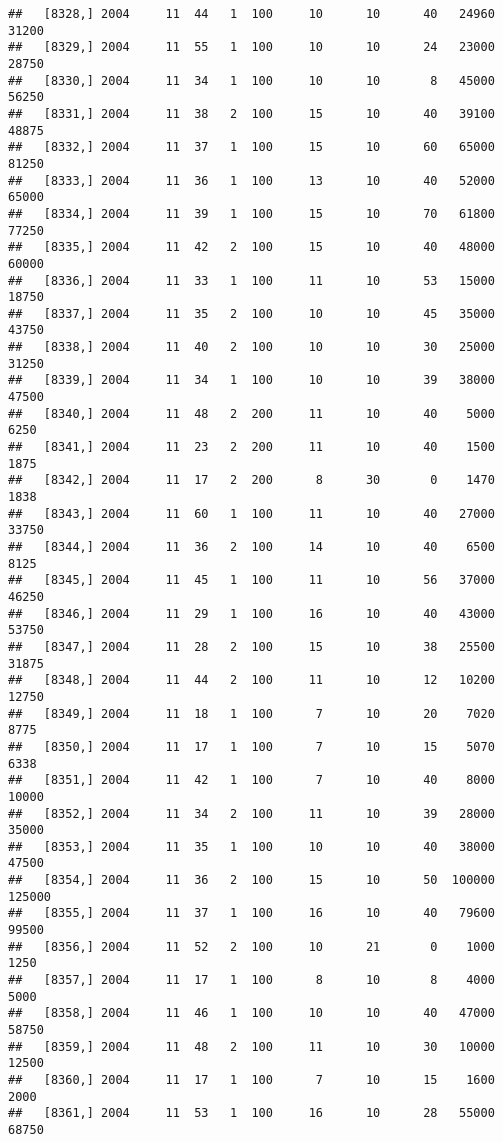 \documentclass{article}\usepackage[]{graphicx}\usepackage[]{color}
\makeatletter
\newenvironment{kframe}{%
 \def\at@end@of@kframe{}%
 \ifinner\ifhmode%
  \def\at@end@of@kframe{\end{minipage}}%
  \begin{minipage}{\columnwidth}%
 \fi\fi%
 \def\FrameCommand##1{\hskip\@totalleftmargin \hskip-\fboxsep
 \colorbox{shadecolor}{##1}\hskip-\fboxsep
     \hskip-\linewidth \hskip-\@totalleftmargin \hskip\columnwidth}%
 \MakeFramed {\advance\hsize-\width
   \@totalleftmargin\z@ \linewidth\hsize
   \@setminipage}}%
 {\par\unskip\endMakeFramed%
 \at@end@of@kframe}
\newenvironment{knitrout}{}{} %
\makeatother
\begin{document}
\begin{knitrout}
\begin{kframe}
\begin{verbatim}
##   [8328,] 2004     11  44   1  100     10      10      40   24960   31200
##   [8329,] 2004     11  55   1  100     10      10      24   23000   28750
##   [8330,] 2004     11  34   1  100     10      10       8   45000   56250
##   [8331,] 2004     11  38   2  100     15      10      40   39100   48875
##   [8332,] 2004     11  37   1  100     15      10      60   65000   81250
##   [8333,] 2004     11  36   1  100     13      10      40   52000   65000
##   [8334,] 2004     11  39   1  100     15      10      70   61800   77250
##   [8335,] 2004     11  42   2  100     15      10      40   48000   60000
##   [8336,] 2004     11  33   1  100     11      10      53   15000   18750
##   [8337,] 2004     11  35   2  100     10      10      45   35000   43750
##   [8338,] 2004     11  40   2  100     10      10      30   25000   31250
##   [8339,] 2004     11  34   1  100     10      10      39   38000   47500
##   [8340,] 2004     11  48   2  200     11      10      40    5000    6250
##   [8341,] 2004     11  23   2  200     11      10      40    1500    1875
##   [8342,] 2004     11  17   2  200      8      30       0    1470    1838
##   [8343,] 2004     11  60   1  100     11      10      40   27000   33750
##   [8344,] 2004     11  36   2  100     14      10      40    6500    8125
##   [8345,] 2004     11  45   1  100     11      10      56   37000   46250
##   [8346,] 2004     11  29   1  100     16      10      40   43000   53750
##   [8347,] 2004     11  28   2  100     15      10      38   25500   31875
##   [8348,] 2004     11  44   2  100     11      10      12   10200   12750
##   [8349,] 2004     11  18   1  100      7      10      20    7020    8775
##   [8350,] 2004     11  17   1  100      7      10      15    5070    6338
##   [8351,] 2004     11  42   1  100      7      10      40    8000   10000
##   [8352,] 2004     11  34   2  100     11      10      39   28000   35000
##   [8353,] 2004     11  35   1  100     10      10      40   38000   47500
##   [8354,] 2004     11  36   2  100     15      10      50  100000  125000
##   [8355,] 2004     11  37   1  100     16      10      40   79600   99500
##   [8356,] 2004     11  52   2  100     10      21       0    1000    1250
##   [8357,] 2004     11  17   1  100      8      10       8    4000    5000
##   [8358,] 2004     11  46   1  100     10      10      40   47000   58750
##   [8359,] 2004     11  48   2  100     11      10      30   10000   12500
##   [8360,] 2004     11  17   1  100      7      10      15    1600    2000
##   [8361,] 2004     11  53   1  100     16      10      28   55000   68750

\end{verbatim}
\end{kframe}
\end{knitrout}
\end{document}
